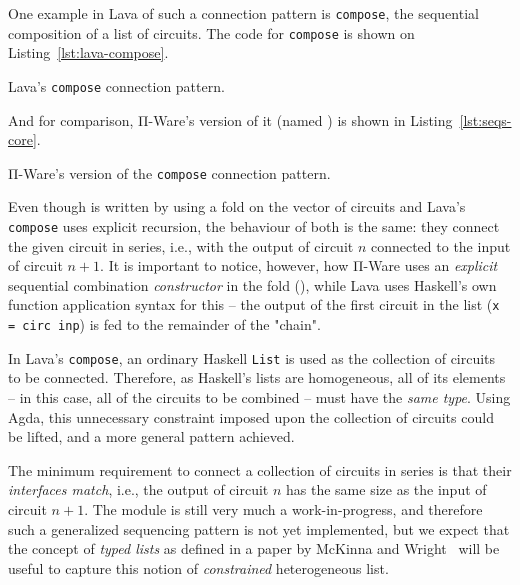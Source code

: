         One example in Lava of such a connection pattern is \texttt{compose},
        the sequential composition of a list of circuits.
        The code for \texttt{compose} is shown on Listing~\ref{lst:lava-compose}.

        \begin{listing}[h]
            \caption{Lava's \texttt{compose} connection pattern.\label{lst:lava-compose}}
        \end{listing}

        And for comparison, Π-Ware's version of it (named ) is shown in Listing~\ref{lst:seqs-core}.

        \begin{listing}[h]
            \caption{Π-Ware's version of the \texttt{compose} connection pattern.\label{lst:seqs-core}}
        \end{listing}

        Even though  is written by using a fold on the vector of circuits and
        Lava's \texttt{compose} uses explicit recursion, the behaviour of both is the same:
        they connect the given circuit in series, i.e.,
        with the output of circuit $n$ connected to the input of circuit $n+1$.
        It is important to notice, however, how Π-Ware uses an \emph{explicit} sequential combination
        \emph{constructor} in the fold (), while Lava uses Haskell's own function application syntax for
        this – the output of the first circuit in the list (\texttt{x = circ inp})
        is fed to the remainder of the "chain".

        In Lava's \texttt{compose}, an ordinary Haskell \texttt{List} is used
        as the collection of circuits to be connected.
        Therefore, as Haskell's lists are homogeneous, all of its elements – in this case,
        all of the circuits to be combined – must have the \emph{same type}.
        Using Agda, this unnecessary constraint imposed upon the collection of circuits could
        be lifted, and a more general pattern achieved.

        The minimum requirement to connect a collection of circuits in series is that their \emph{interfaces match},
        i.e., the output of circuit $n$ has the same size as the input of circuit $n+1$.
        The  module is still very much a work-in-progress,
        and therefore such a generalized sequencing pattern is not yet implemented,
        but we expect that the concept of \emph{typed lists} as defined in a paper by
        McKinna and Wright~\cite{typed-stack-safe-compiler} will be useful to capture this notion of
        \emph{constrained} heterogeneous list.

